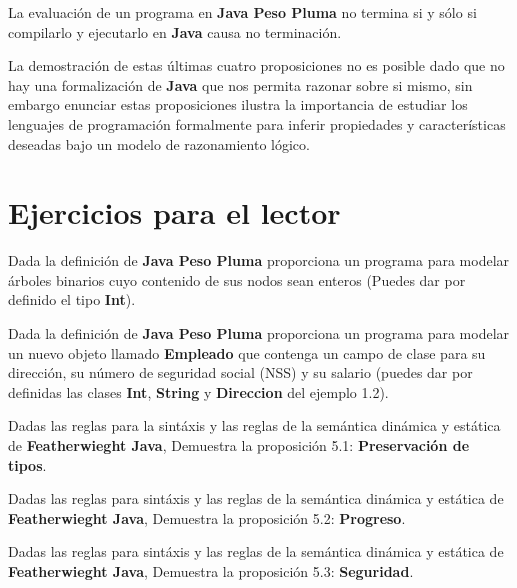 \bigskip

\begin{definition} La evaluación de un programa en \textbf{Java Peso Pluma} no termina si y sólo si compilarlo y ejecutarlo en \textbf{Java} causa no terminación.
\end{definition}

\bigskip

La demostración de estas últimas cuatro proposiciones no es posible dado que no hay una formalización de \textbf{Java} que nos permita razonar sobre si mismo, sin embargo enunciar estas proposiciones ilustra la importancia de estudiar los lenguajes de programación formalmente para inferir propiedades y características deseadas bajo un modelo de razonamiento lógico.

\newpage

\section{Ejercicios para el lector}

\begin{exercise}
    Dada la definición de \textbf{Java Peso Pluma} proporciona un programa para modelar árboles binarios cuyo contenido de sus nodos sean enteros (Puedes dar por definido el tipo \textbf{Int}).
\end{exercise}

\bigskip

\begin{exercise}
    Dada la definición de \textbf{Java Peso Pluma} proporciona un programa para modelar un nuevo objeto llamado \textbf{Empleado} que contenga un campo de clase para su dirección, su número de seguridad social (NSS) y su salario (puedes dar por definidas las clases \textbf{Int}, \textbf{String} y \textbf{Direccion} del ejemplo 1.2).
\end{exercise}

\bigskip

\begin{exercise}
    Dadas las reglas para la sintáxis y las reglas de la semántica dinámica y estática de \textbf{Featherwieght Java}, Demuestra la proposición 5.1: \textbf{Preservación de tipos}.
\end{exercise}

\bigskip

\begin{exercise}
   Dadas las reglas para sintáxis y las reglas de la semántica dinámica y estática de \textbf{Featherwieght Java}, Demuestra la proposición 5.2: \textbf{Progreso}.
\end{exercise}

\bigskip

\begin{exercise}
   Dadas las reglas para sintáxis y las reglas de la semántica dinámica y estática de \textbf{Featherwieght Java}, Demuestra la proposición 5.3: \textbf{Seguridad}.
\end{exercise}